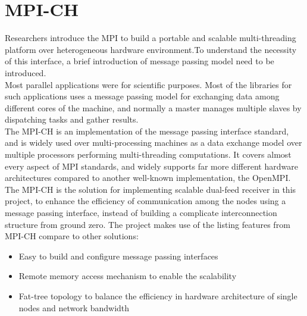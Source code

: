 \documentclass[11pt,openright,a4paper]{report}
\begin{document}
\section{MPI-CH}
Researchers introduce the MPI to build a portable and scalable multi-threading platform over heterogeneous hardware environment\cite{dongarra1995introduction}.To understand the necessity of this interface, a brief introduction of message passing model need to be introduced.\\
Most parallel applications were for scientific purposes\cite{kendall_2016}. Most of the libraries for such applications uses a message passing model for exchanging data among different cores of the machine, and normally a master manages multiple slaves by dispatching tasks and gather results.\\
The MPI-CH is an implementation of the message passing interface standard, and is widely used over multi-processing machines as a data exchange model over multiple processors performing multi-threading computations. It covers almost every aspect of MPI standards, and widely supports far more different hardware architectures compared to another well-known implementation, the OpenMPI.\\
The MPI-CH is the solution for implementing scalable dual-feed receiver in this project, to enhance the efficiency of communication among the nodes using a message passing interface, instead of building a complicate interconnection structure from ground zero. The project makes use of the listing features from MPI-CH compare to other solutions:
\begin{itemize}
	\item Easy to build and configure message passing interfaces
	\item Remote memory access mechanism to enable the scalability
	\item Fat-tree topology to balance the efficiency in hardware architecture of single nodes and network bandwidth
\end{itemize} 
\end{document}
